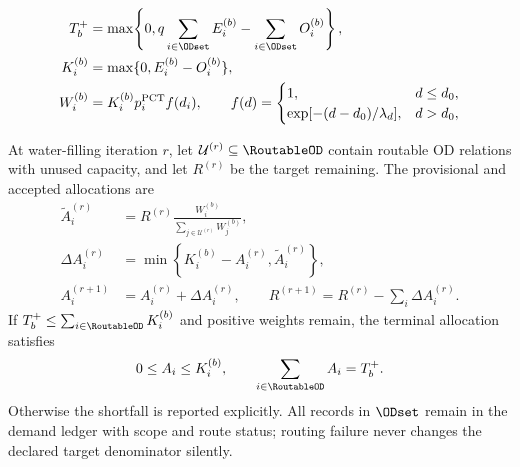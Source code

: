 \begin{align}
T_b^{+}
 &= \max\!\left\{0,
 q\sum_{i\in\ODset}E_i^{(b)}
 -\sum_{i\in\ODset}O_i^{(b)}\right\},
\label{eq:target-additional}\\
K_i^{(b)}
 &= \max\{0,E_i^{(b)}-O_i^{(b)}\},
\label{eq:allocation-capacity}\\
W_i^{(b)}
 &= K_i^{(b)} p_i^{\mathrm{PCT}} f(d_i),
\qquad
f(d)=
\begin{cases}
1, & d\le d_0,\\
\exp[-(d-d_0)/\lambda_d], & d>d_0,
\end{cases}
\label{eq:allocation-weight}
\end{align}

At water-filling iteration $r$, let $\mathcal{U}^{(r)}\subseteq\RoutableOD$
contain routable OD relations with unused capacity, and let $R^{(r)}$ be the
target remaining. The provisional and accepted allocations are
\begin{align}
\widetilde A_i^{(r)}
 &= R^{(r)}\frac{W_i^{(b)}}
 {\sum_{j\in\mathcal{U}^{(r)}}W_j^{(b)}},
\label{eq:allocation-provisional}\\
\Delta A_i^{(r)}
 &= \min\!\left\{K_i^{(b)}-A_i^{(r)},\widetilde A_i^{(r)}\right\},
\label{eq:allocation-capped}\\
A_i^{(r+1)}
 &= A_i^{(r)}+\Delta A_i^{(r)},
\qquad
R^{(r+1)}=R^{(r)}-\sum_i\Delta A_i^{(r)}.
\label{eq:allocation-update}
\end{align}
If $T_b^{+}\le\sum_{i\in\RoutableOD}K_i^{(b)}$ and positive weights remain,
the terminal allocation
satisfies
\begin{equation}
0\le A_i\le K_i^{(b)},
\qquad
\sum_{i\in\RoutableOD}A_i=T_b^{+}.
\label{eq:allocation-conservation}
\end{equation}
Otherwise the shortfall is reported explicitly. All records in $\ODset$ remain
in the demand ledger with scope and route status; routing failure never changes
the declared target denominator silently.
